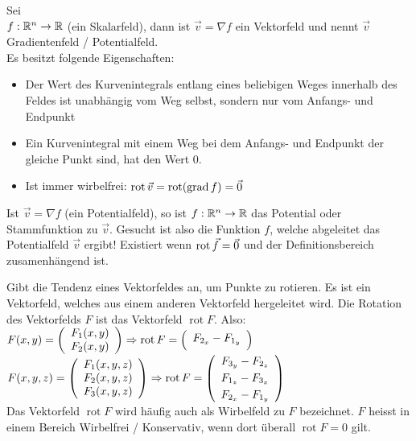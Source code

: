 \begin{definition} Sei\\ 
$f: \mathbb{R}^n \to \mathbb{R}$ (ein Skalarfeld), dann ist $\vec{v} = \nabla f$ ein Vektorfeld und nennt $\vec{v}$
Gradientenfeld / Potentialfeld.\\
Es besitzt folgende Eigenschaften:
\begin{itemize}[leftmargin=0.5cm]
	\item Der Wert des Kurvenintegrals entlang eines beliebigen Weges innerhalb des
	Feldes ist unabhängig vom Weg selbst, sondern nur vom Anfangs- und Endpunkt
	\item Ein Kurvenintegral mit einem Weg bei dem Anfangs- und Endpunkt der
	gleiche Punkt sind, hat den Wert 0.
	\item Ist immer wirbelfrei: $\operatorname{rot} \vec{v} = \operatorname{rot}(\operatorname{grad} f) = \vec{0}$
\end{itemize}
\end{definition}

\begin{definition}[Potential]
Ist $\vec{v} = \nabla f$ (ein Potentialfeld), so ist $f: \mathbb{R}^n \to \mathbb{R}$ das Potential oder Stammfunktion zu $\vec{v}$. Gesucht ist also die Funktion $f$, welche abgeleitet das Potentialfeld $\vec{v}$ ergibt!
Existiert wenn $\operatorname{rot} \vec{f} = \vec{0}$ und der Definitionsbereich zusamenhängend ist.
\end{definition}

\begin{definition}
Gibt die Tendenz eines Vektorfeldes an, um Punkte zu rotieren. Es ist ein Vektorfeld, welches aus einem anderen Vektorfeld hergeleitet wird. Die Rotation des Vektorfelds $F$ ist das Vektorfeld $\operatorname{rot} F$. Also: 
$F (x, y) = 
\left(
	\begin{array}{c}
		F_1 (x, y) \\
		F_2 (x, y)
	\end{array}
\right) \Rightarrow
 \operatorname{rot} F = 
\left(
	\begin{array}{c}
		\vspace{3pt} F_{2_x} - F_{1_y}
	\end{array}
\right)$\\
$F(x, y, z) = 
\left(
	\begin{array}{c}
		F_1 (x, y, z) \\
		F_2 (x, y, z) \\
		F_3 (x, y, z)
	\end{array}
\right) \Rightarrow
 \operatorname{rot} F = 
\left(
	\begin{array}{c}
		\vspace{3pt} F_{3_y} - F_{2_z} \\
		\vspace{3pt} F_{1_z} - F_{3_x} \\
					 F_{2_x} - F_{1_y}
	\end{array}
\right)$\\
Das Vektorfeld $\operatorname{rot} F$ wird häufig auch als Wirbelfeld zu $F$ bezeichnet. $F$ heisst in einem Bereich Wirbelfrei / Konservativ, wenn dort überall $\operatorname{rot} F = 0$ gilt.
\end{definition}

